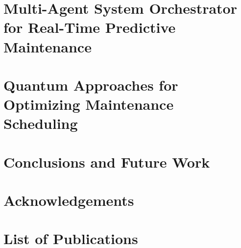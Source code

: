 \documentclass[11pt]{report}
\begin{document}
\chapter{Multi-Agent System Orchestrator for Real-Time Predictive Maintenance}
\label{chap:agentic}


\chapter{Quantum Approaches for Optimizing Maintenance Scheduling}
\label{chap:quantum}


\chapter{Conclusions and Future Work}
\label{chap:conclusion}


\newpage




\newpage
\chapter*{Acknowledgements}


\newpage
\chapter*{List of Publications}

\end{document}

